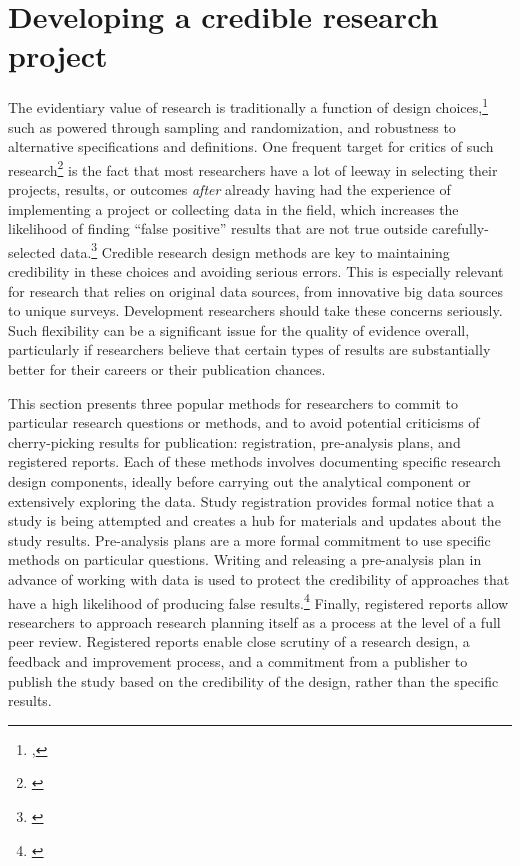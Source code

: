 \documentclass[]{tufte-book}
\begin{document}
\hypertarget{developing-a-credible-research-project}{%
\section*{Developing a credible research
project}\label{developing-a-credible-research-project}}

The evidentiary value of research is traditionally a function of design
choices,\footnote{\cite{@angrist2010credibility},\cite{@ioannidis2005most}}
such as powered through sampling and randomization, and robustness to
alternative specifications and definitions. One frequent target for
critics of such research\footnote{\cite{@ioannidis2017power}} is the
fact that most researchers have a lot of leeway in selecting their
projects, results, or outcomes \emph{after} already having had the
experience of implementing a project or collecting data in the field,
which increases the likelihood of finding ``false positive'' results
that are not true outside carefully-selected data.\footnote{\cite{@simmons2011false}}
Credible research design methods are key to maintaining credibility in
these choices and avoiding serious errors. This is especially relevant
for research that relies on original data sources, from innovative big
data sources to unique surveys. Development researchers should take
these concerns seriously. Such flexibility can be a significant issue
for the quality of evidence overall, particularly if researchers believe
that certain types of results are substantially better for their careers
or their publication chances.

This section presents three popular methods for researchers to commit to
particular research questions or methods, and to avoid potential
criticisms of cherry-picking results for publication: registration,
pre-analysis plans, and registered
reports.
Each of these methods involves documenting specific research design
components, ideally before carrying out the analytical component or
extensively exploring the data. Study registration provides formal
notice that a study is being attempted and creates a hub for materials
and updates about the study results. Pre-analysis plans are a more
formal commitment to use specific methods on particular questions.
Writing and releasing a pre-analysis plan in advance of working with
data is used to protect the credibility of approaches that have a high
likelihood of producing false results.\footnote{\cite{@wicherts2016degrees}}
Finally, registered reports allow researchers to approach research
planning itself as a process at the level of a full peer review.
Registered reports enable close scrutiny of a research design, a
feedback and improvement process, and a commitment from a publisher to
publish the study based on the credibility of the design, rather than
the specific results.
\end{document}
